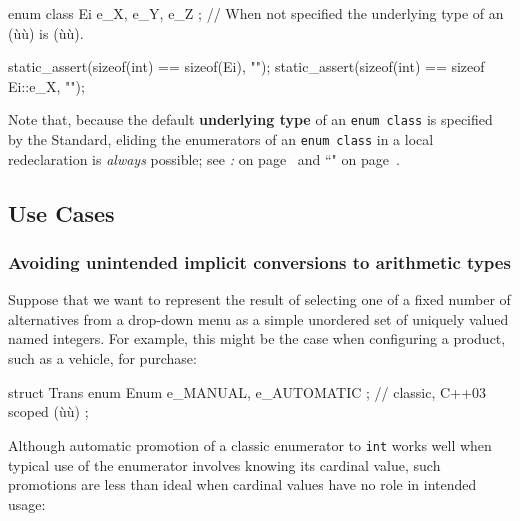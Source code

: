 \begin{emcppslisting}
enum class Ei { e_X, e_Y, e_Z };
    // When not specified the underlying type of an (ù{}ù) is (ù{}ù).

static_assert(sizeof(int) == sizeof(Ei),     "");
static_assert(sizeof(int) == sizeof Ei::e_X, "");
\end{emcppslisting}

\noindent Note that, because the default \textbf{underlying type} of an
\texttt{enum}~\texttt{class} is specified by the Standard, eliding the
enumerators of an \texttt{enum}~\texttt{class} in
a local redeclaration is \emph{always} possible; see
\textit{: } on page~\pageref{external-use-of-opaque-enumerators-enumclass} and ``" on page~\pageref{enumopaque}.

\subsection[Use Cases]{Use Cases}\label{use-cases-enumclass}

\subsubsection[Avoiding unintended implicit conversions to arithmetic types]{Avoiding unintended implicit conversions to arithmetic types}\label{avoiding-unintended-implicit-conversions-to-arithmetic-types}

Suppose that we want to represent the result of selecting one of a fixed
number of alternatives from a drop-down menu as a simple unordered set
of uniquely valued named integers. For example, this might be the case
when configuring a product, such as a vehicle, for purchase:

\begin{emcppslisting}
struct Trans
{
    enum Enum { e_MANUAL, e_AUTOMATIC };  // classic, C++03 scoped (ù{}ù)
};
\end{emcppslisting}

\noindent Although automatic promotion of a classic enumerator to \texttt{int}
works well when typical use of the enumerator involves knowing its
cardinal value, such promotions are less than ideal when cardinal values
have no role in intended usage:

